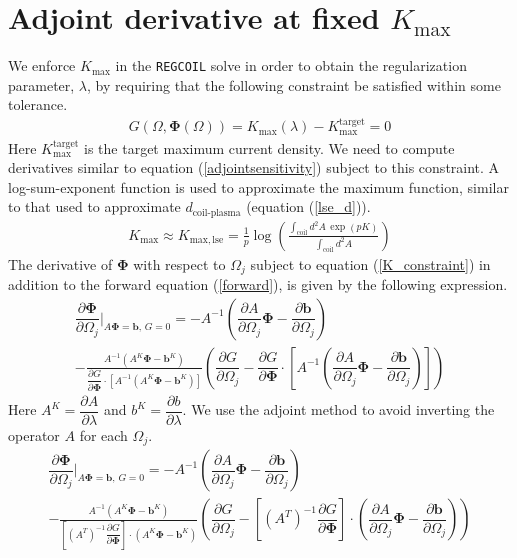 \documentclass[aps,unsortedaddress]{revtex4-1}
\newcommand{\partder}[2]{\dfrac{\partial  #1}{\partial  #2}}
\begin{document}
\section{Adjoint derivative at fixed $K_{\text{max}}$}
\label{lambda_search}
We enforce $K_{\text{max}}$ in the \texttt{REGCOIL} solve in order to obtain the regularization parameter, $\lambda$, by requiring that the following constraint be satisfied within some tolerance. 
\begin{gather}
G(\Omega, \bm{\Phi}(\Omega)) = K_{\text{max}}(\lambda) - K^{\text{target}}_{\text{max}}  = 0 
\label{K_constraint}
\end{gather}
Here $K^{\text{target}}_{\text{max}}$ is the target maximum current density. We need to compute derivatives similar to equation (\ref{adjointsensitivity}) subject to this constraint. A log-sum-exponent function is used to approximate the maximum function, similar to that used to approximate $d_{\text{coil-plasma}}$ (equation (\ref{lse_d})).
\begin{gather}
K_{\text{max}} \approx K_{\text{max},\, \text{lse}} =  \frac{1}{p} \log \left( \frac{\int_{\text{coil}} d^2 A \,  \exp\left(p K\right)}{ \int_{\text{coil}} d^2 A } \right)
\end{gather}
The derivative of $\bm{\Phi}$ with respect to $\Omega_j$ subject to equation (\ref{K_constraint}) in addition to the forward equation (\ref{forward}), is given by the following expression. 
\begin{multline}
\partder{\bm{\Phi}}{\Omega_j} \bigg \rvert_{A \bm{\Phi} = \bm{b}, \, G = 0} = - A^{-1} \left( \partder{A}{\Omega_j} \bm{\Phi} - \partder{\bm{b}}{\Omega_j} \right)\\ - \frac{A^{-1} \left( A^K \bm{\Phi} - \bm{b}^K \right) }{ \partder{G}{\bm{\Phi}} \cdot \left[ A^{-1} \left( A^K \bm{\Phi} - \bm{b}^K \right) \right] } \left( \partder{G}{\Omega_j} - \partder{G}{\bm{\Phi}} \cdot \left[ A^{-1} \left( \partder{A}{\Omega_j} \bm{\Phi} - \partder{\bm{b}}{\Omega_j} \right) \right] \right) 
\end{multline}
Here $A^K = \partder{A}{\lambda}$ and $b^K = \partder{b}{\lambda}$. We use the adjoint method to avoid inverting the operator $A$ for each $\Omega_j$.
\begin{multline}
\partder{\bm{\Phi}}{\Omega_j} \bigg \rvert_{A \bm{\Phi} = \bm{b}, \, G = 0} = - A^{-1} \left( \partder{A}{\Omega_j} \bm{\Phi} - \partder{\bm{b}}{\Omega_j} \right)\\ - \frac{A^{-1} \left( A^K \bm{\Phi} - \bm{b}^K \right) }{ \left[ \left( A^T \right)^{-1} \partder{G}{\bm{\Phi}} \right] \cdot \left( A^K \bm{\Phi} - \bm{b}^K \right) } \left( \partder{G}{\Omega_j} - \left[ \left( A^T \right)^{-1} \partder{G}{\bm{\Phi}} \right]  \cdot \left( \partder{A}{\Omega_j} \bm{\Phi} - \partder{\bm{b}}{\Omega_j} \right) \right) 
\label{withadjoint}
\end{multline}
\end{document}

